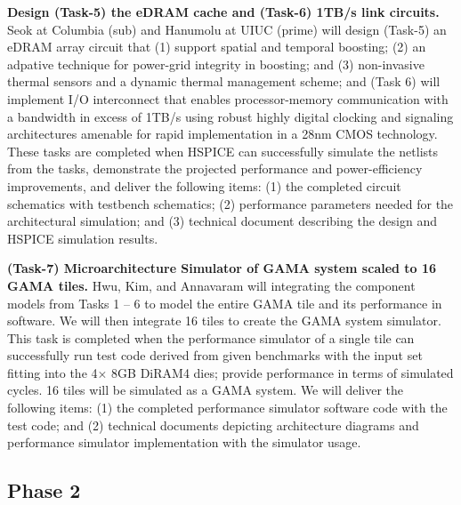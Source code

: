 \vspace{3pt}
\noindent
\textbf{Design (Task-5) the eDRAM cache and (Task-6) 1TB/s link circuits.}
Seok at Columbia (sub) and Hanumolu at UIUC (prime) will design 
(Task-5) an eDRAM array circuit that (1) support spatial and temporal boosting; (2) an adpative technique for power-grid integrity in boosting; and (3) non-invasive thermal sensors and a dynamic thermal management scheme; and 
(Task 6) will implement I/O interconnect that enables processor-memory communication with a bandwidth in excess of 1TB/s using robust highly digital clocking and signaling architectures amenable for rapid implementation in a 28nm CMOS technology.
These tasks are completed when HSPICE can successfully simulate the netlists from the tasks, demonstrate the projected performance and power-efficiency improvements, and deliver the following items:
(1) the completed circuit schematics with testbench schematics; (2) performance parameters needed for the architectural simulation; and (3) technical document describing the design and HSPICE simulation results.


\vspace{3pt}
\noindent
\textbf{(Task-7) Microarchitecture Simulator of GAMA system scaled to 16 GAMA tiles.}
Hwu, Kim, and Annavaram will integrating the component models from Tasks 1 -- 6 to model the entire GAMA tile and its performance in software. We will then integrate 16 tiles to create the GAMA system simulator. 
This task is completed when the performance simulator of a single tile can successfully run test code derived from given benchmarks with the input set fitting into the 4$\times$ 8GB DiRAM4 dies; provide performance in terms of simulated cycles. 16 tiles will be simulated as a GAMA system. We will deliver the following items:
(1) the completed performance simulator software code with the test code; and (2) technical documents depicting architecture diagrams and performance simulator implementation with the simulator usage.


\subsection{Phase 2}
%

